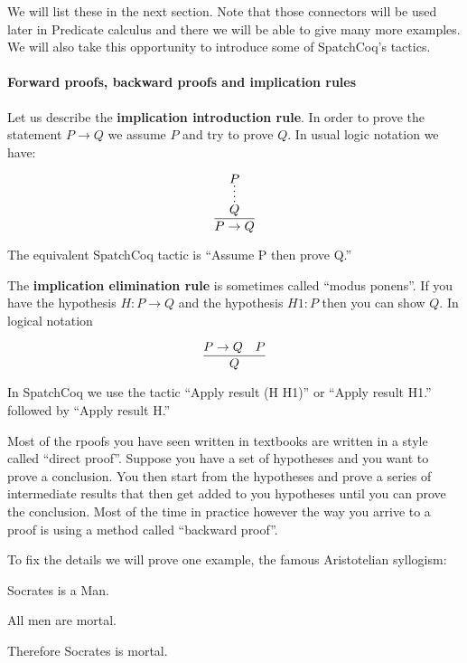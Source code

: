 \begin{itemize}
 
 

 We will list these in the next section. Note that those connectors will be used later in Predicate calculus and there we will be able to give many more examples. We will also take this opportunity to introduce some of SpatchCoq's tactics.

\paragraph{\bf Forward proofs, backward proofs and implication rules}

Let us describe the {\bf implication introduction rule}.  In order to prove the statement $P\rightarrow Q$ we  assume $P$ and try to prove $Q$. In usual logic notation we have:

$$\infer{P\rightarrow Q}{%
    \infer*{Q}{P}
}$$

The equivalent SpatchCoq tactic is ``Assume P then prove Q.''


The {\bf implication elimination rule} is sometimes called ``modus ponens''. If you have the hypothesis $H:P\rightarrow Q$ and the hypothesis $H1:P$ then you can show $Q$. In logical notation

$$\infer{Q}{P\rightarrow Q & P}$$

In SpatchCoq we use the tactic ``Apply result (H H1)'' or ``Apply result H1.'' followed by ``Apply result H.''



Most of the rpoofs you have seen written in textbooks are written in a style called ``direct proof''. Suppose you have a set of hypotheses and you want to prove a conclusion. You then start from the hypotheses and prove a series of intermediate results that then get added to you hypotheses until you can prove the conclusion. Most of the time in practice however the way you arrive to a proof is using a method called ``backward proof''. 

To fix the details we will prove one example, the famous Aristotelian syllogism:

Socrates is a Man.

All men are mortal.

Therefore Socrates is mortal.


\end{itemize}
